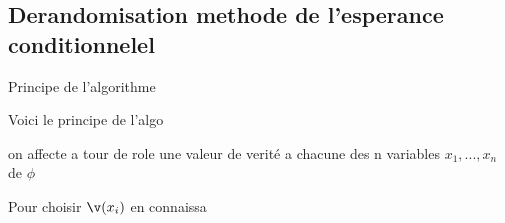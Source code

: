 \documentclass[a4paper,french,bookmarks]{article}
\begin{document}
    \subsection{Derandomisation methode de l'esperance conditionnelel}
    
   \begin{form}{Principe de l'algorithme}
   
    Voici le principe de l'algo

    \begin{enumerate}
        \itt on affecte a tour de role une valeur de verité a chacune des n variables 
        $x_1, ..., x_n$ de $\phi$

        \itt Pour choisir $\v(x_i)$ en connaissa
        
    \end{enumerate}
   
   \end{form} 
    

    
         
\end{document}
